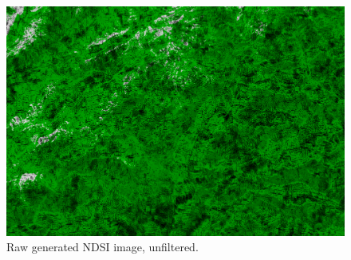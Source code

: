 \documentclass[12pt, a4paper]{report}
\begin{document}
	\begin{figure}[h!]
		\centering
		\includegraphics[width=\linewidth]{../images/LC81940282015363LGN02_Motion Predicted NDSI_unfiltered_small.png}
		\caption{Raw generated NDSI image, unfiltered.}
		\label{fig:unfiltered}
	\end{figure}
\end{document}

